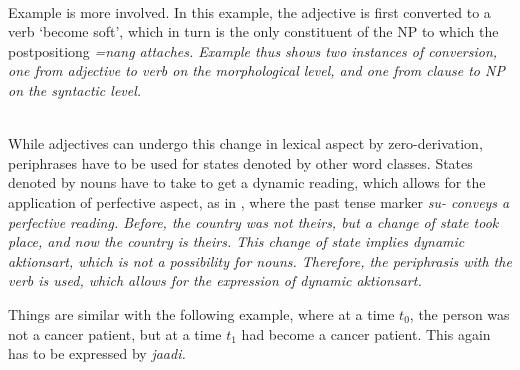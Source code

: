  \\
Example  is more involved. In this example, the adjective  is first converted to a verb `become soft', which in turn is the only constituent of the NP to which the postpositiong \em =nang \em attaches. Example  thus shows two instances of conversion, one from adjective to verb on the morphological level, and one from clause to NP on the syntactic level.


\xbox{16}{
\ea \label{ex:soa:events:adj:doubleconversion}
\gll [[[[\zero{} lummas$_{ADJ}]$ $-\zero]_{verb}$]]$_{CLS}$ =\zero]$_{NP}$ =nang blaakang minnyak klaapa=ka inni=yang gooreng. \\ %
      { } soft -vblzr =\textsc{nmlzr} =\textsc{dat} after coconut.oil coconut=\textsc{loc} \textsc{prox}=\textsc{acc} fry \\
\z
} \\

While adjectives can undergo this change in lexical aspect by zero-derivation, periphrases have to be used for states denoted by other word classes. States denoted by nouns have to take  to get a dynamic reading, which allows for the application of perfective aspect, as in , where the past tense marker \em su- \em conveys a perfective reading. Before, the country was not theirs, but a change of state took place, and now the country is theirs. This change of state implies dynamic aktionsart, which is not a possibility for nouns. Therefore, the periphrasis with the verb  is used, which allows for the expression of dynamic aktionsart.


Things are similar with the following example, where at a time $t_0$, the person was not a  cancer patient, but at a time $t_1$ had become a cancer patient. This again has to be expressed by \em jaadi\em.

